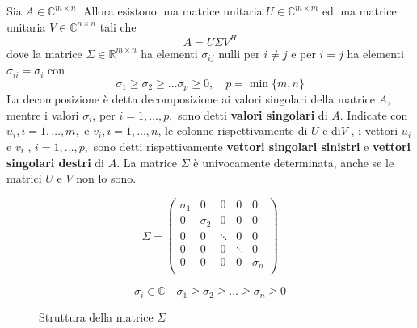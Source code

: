 
\begin{theo} Sia $A \in \mathbb{C}^{m \times n}$. Allora esistono una matrice
unitaria $U \in \mathbb{C}^{m \times m}$ ed una matrice unitaria $V
\in \mathbb{C}^{n \times n}$ tali che
\begin{equation}
  \label{eq:06minq09} A = U \Sigma V^{H}
\end{equation} dove la matrice $\Sigma \in \mathbb{R}^{m \times n}$ ha
elementi $\sigma_{ij}$ nulli per $i \neq j$ e per $i =j$ ha elementi
$\sigma_{ii} = \sigma_i$ con
$$
\sigma_1 \geq \sigma_2 \geq \ldots \sigma_p \geq 0, \quad p =
\min\{m,n\}
$$
La decomposizione \`e detta decomposizione ai valori singolari della
matrice $A$, mentre i valori $\sigma_i$, per $i = 1, \ldots , p,$ sono
detti \textbf{valori singolari} di $A$. Indicate con $u_i , i = 1,
\ldots , m,$ e $v_i , i = 1, \ldots , n$, le colonne rispettivamente
di $ U$ e di$ V$ , i vettori $u_i$ e $v_i$ , $i = 1, \ldots , p,$ sono
detti rispettivamente \textbf{vettori singolari sinistri} e
\textbf{vettori singolari destri} di $A$.  La matrice $\Sigma$ \`e
univocamente determinata, anche se le matrici $U$ e $V$ non lo sono.
\end{theo}

\begin{figure}[hb] \centering
$$
\Sigma =
\begin{pmatrix} 
  \sigma_1 & 0        & 0      & 0      & 0        \\ 
  0        & \sigma_2 & 0      & 0      & 0        \\
  0        & 0        & \ddots & 0      & 0        \\ 
  0        & 0        & 0      & \ddots & 0        \\ 
  0        & 0        & 0      & 0      & \sigma_n \\
\end{pmatrix} $$

$$ \sigma_i \in \mathbb{C}
\quad \sigma_1 \geq \sigma_2 \geq \ldots \geq \sigma_n \geq 0$$
\caption[Struttura della matrice $\Sigma$]{Struttura della matrice
  $\Sigma$}
\end{figure}

